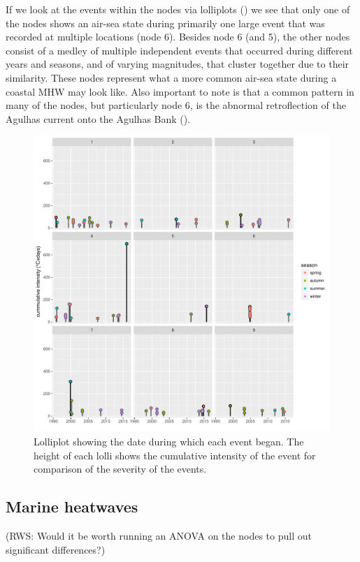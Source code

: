 \documentclass[a4paper,10pt,review]{elsarticle}
\begin{document}
If we look at the events within the nodes via lolliplots () we see that only one of the nodes shows an air-sea state during primarily one large event that was recorded at multiple locations (node 6). Besides node 6 (and 5), the other nodes consist of a medley of multiple independent events that occurred during different years and seasons, and of varying magnitudes, that cluster together due to their similarity. These nodes represent what a more common air-sea state during a coastal MHW may look like. Also important to note is that a common pattern in many of the nodes, but particularly node 6, is the abnormal retroflection of the Agulhas current onto the Agulhas Bank ().

\begin{figure}
\includegraphics[width=1.0\textwidth]{figure_5.pdf}
\caption{Lolliplot showing the date during which each event began. The height of each lolli shows the cumulative intensity of the event for comparison of the severity of the events.}
\label{figure5}
\end{figure}

\subsection{Marine heatwaves}

(RWS: Would it be worth running an ANOVA on the nodes to pull out significant differences?)
\end{document}
